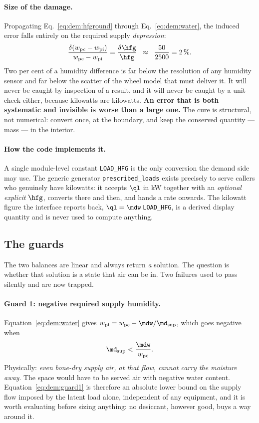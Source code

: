 \paragraph{Size of the damage.} Propagating Eq.~\eqref{eq:dem:hfground} through
Eq.~\eqref{eq:dem:water}, the induced error falls entirely on the required supply
\emph{depression}:
\begin{equation}
\frac{\delta\!\left(w_{\mathrm{pc}}-w_{\mathrm{pi}}\right)}
     {w_{\mathrm{pc}}-w_{\mathrm{pi}}}
=\frac{\delta \hfg}{\hfg}
\;\;\approx\;\;\frac{50}{2500}=2\,\% .
\label{eq:dem:hfgerr}
\end{equation}
Two per cent of a humidity difference is far below the resolution of any humidity
sensor and far below the scatter of the wheel model that must deliver it. It will
never be caught by inspection of a result, and it will never be caught by a unit
check either, because kilowatts are kilowatts. \textbf{An error that is both
systematic and invisible is worse than a large one.} The cure is structural, not
numerical: convert once, at the boundary, and keep the conserved quantity ---
mass --- in the interior.

\paragraph{How the code implements it.} A single module-level constant
\verb|LOAD_HFG| is the only conversion the demand side may use. The generic
generator \verb|prescribed_loads| exists precisely to serve callers who genuinely
have kilowatts: it accepts $\ql$ in \si{\kilo\watt} together with an
\emph{optional explicit} $\hfg$, converts there and then, and hands a rate
onwards. The kilowatt figure the interface reports back, $\ql=\mdw\,$\verb|LOAD_HFG|,
is a derived display quantity and is never used to compute anything.

\subsection{The guards}
\label{sec:dem:guards}

The two balances are linear and always return \emph{a} solution. The question is
whether that solution is a state that air can be in. Two failures used to pass
silently and are now trapped.

\paragraph{Guard 1: negative required supply humidity.} Equation~\eqref{eq:dem:water}
gives $w_{\mathrm{pi}}=w_{\mathrm{pc}}-\mdw/\md_{\mathrm{sup}}$, which goes
negative when
\begin{equation}
\md_{\mathrm{sup}}<\frac{\mdw}{w_{\mathrm{pc}}} .
\label{eq:dem:guard1}
\end{equation}
Physically: \emph{even bone-dry supply air, at that flow, cannot carry the
moisture away}. The space would have to be served air with negative water
content. Equation~\eqref{eq:dem:guard1} is therefore an absolute lower bound on
the supply flow imposed by the latent load alone, independent of any equipment,
and it is worth evaluating before sizing anything: no desiccant, however good,
buys a way around it.

